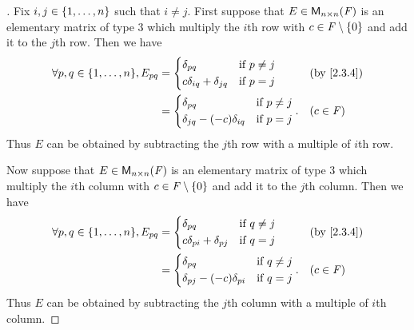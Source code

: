 \begin{proof}[]
  Fix \(i, j \in \left\lbrace1, \dots, n\right\rbrace\) such that \(i \neq j\).
  First suppose that \(E \in \mathsf{M}_{{n} \times n}({\mathit{F}})\) is an elementary matrix of type 3 which multiply the \(i\)th row with \(c \in \mathit{F} \setminus \left\lbrace0\right\rbrace\) and add it to the \(j\)th row.
  Then we have
  \begin{align*}
    \forall p, q \in \set{1, \dots, n}, E_{p q} & = \begin{dcases}
                                                      \delta_{p q}                  & \text{if } p \neq j \\
                                                      c \delta_{i q} + \delta_{j q} & \text{if } p = j
                                                    \end{dcases}    &  & \text{(by \cref{2.3.4})}    \\
                                                & = \begin{dcases}
                                                      \delta_{p q}                     & \text{if } p \neq j \\
                                                      \delta_{j q} - (-c) \delta_{i q} & \text{if } p = j
                                                    \end{dcases}. &  & (c \in \F)
  \end{align*}
  Thus \(E\) can be obtained by subtracting the \(j\)th row with a multiple of \(i\)th row.

  Now suppose that \(E \in \mathsf{M}_{{n} \times n}({\mathit{F}})\) is an elementary matrix of type 3 which multiply the \(i\)th column with \(c \in \mathit{F} \setminus \left\lbrace0\right\rbrace\) and add it to the \(j\)th column.
  Then we have
  \begin{align*}
    \forall p, q \in \set{1, \dots, n}, E_{p q} & = \begin{dcases}
                                                      \delta_{p q}                  & \text{if } q \neq j \\
                                                      c \delta_{p i} + \delta_{p j} & \text{if } q = j
                                                    \end{dcases}    &  & \text{(by \cref{2.3.4})}    \\
                                                & = \begin{dcases}
                                                      \delta_{p q}                     & \text{if } q \neq j \\
                                                      \delta_{p j} - (-c) \delta_{p i} & \text{if } q = j
                                                    \end{dcases}. &  & (c \in \F)
  \end{align*}
  Thus \(E\) can be obtained by subtracting the \(j\)th column with a multiple of \(i\)th column.
\end{proof}

